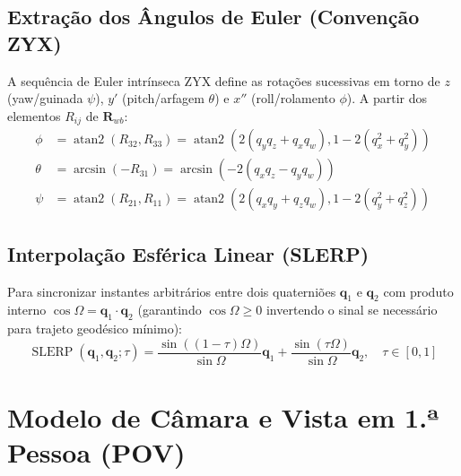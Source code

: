 \documentclass[11pt,a4paper]{article}
\newcommand{\vv}[1]{\mathbf{#1}}
\newcommand{\Rot}{\mathbf{R}}
\theoremstyle{definition}
\begin{document}
\subsection{Extração dos Ângulos de Euler (Convenção ZYX)}
A sequência de Euler intrínseca ZYX define as rotações sucessivas em torno de $z$ (yaw/guinada $\psi$), $y'$ (pitch/arfagem $\theta$) e $x''$ (roll/rolamento $\phi$). A partir dos elementos $R_{ij}$ de $\Rot_{wb}$:
\begin{align}
    \phi &= \operatorname{atan2}(R_{32}, R_{33}) = \operatorname{atan2}(2(q_y q_z + q_x q_w), 1 - 2(q_x^2 + q_y^2)) \\
    \theta &= \arcsin(-R_{31}) = \arcsin(-2(q_x q_z - q_y q_w)) \\
    \psi &= \operatorname{atan2}(R_{21}, R_{11}) = \operatorname{atan2}(2(q_x q_y + q_z q_w), 1 - 2(q_y^2 + q_z^2))
\end{align}

\subsection{Interpolação Esférica Linear (SLERP)}
Para sincronizar instantes arbitrários entre dois quaterniões $\vv{q}_1$ e $\vv{q}_2$ com produto interno $\cos\Omega = \vv{q}_1 \cdot \vv{q}_2$ (garantindo $\cos\Omega \ge 0$ invertendo o sinal se necessário para trajeto geodésico mínimo):
\begin{equation}
    \operatorname{SLERP}(\vv{q}_1, \vv{q}_2; \tau) = \frac{\sin((1 - \tau)\Omega)}{\sin\Omega}\vv{q}_1 + \frac{\sin(\tau\Omega)}{\sin\Omega}\vv{q}_2, \quad \tau \in [0, 1]
\end{equation}

\section{Modelo de Câmara e Vista em 1.ª Pessoa (POV)}
\end{document}
